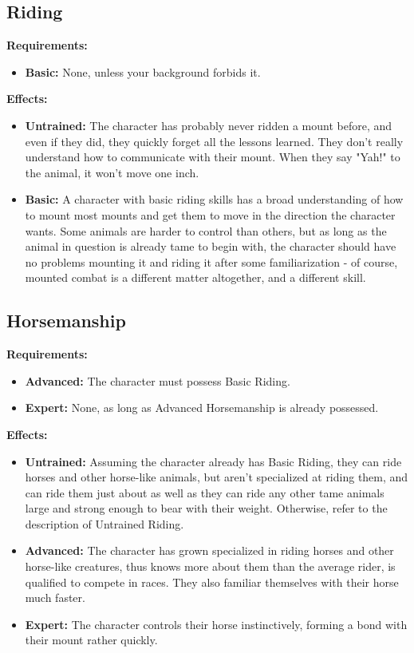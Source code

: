 \documentclass[openany,10pt,a4paper]{book}
\begin{document}
\subsection{Riding}
\begin{table}[!ht]
\centering
{}
\end{table}
\textbf{Requirements:}
\begin{itemize}
	\item \textbf{Basic:} None, unless your background forbids it.
\end{itemize}
\textbf{Effects:}
\begin{itemize}
	\item \textbf{Untrained:} The character has probably never ridden a mount before, and even if they did, they quickly forget all the lessons learned. They don't really understand how to communicate with their mount. When they say "Yah!" to the animal, it won't move one inch. 
	\item \textbf{Basic:} A character with basic riding skills has a broad understanding of how to mount most mounts and get them to move in the direction the character wants. Some animals are harder to control than others, but as long as the animal in question is already tame to begin with, the character should have no problems mounting it and riding it after some familiarization - of course, mounted combat is a different matter altogether, and a different skill.
\end{itemize}\newpage
\subsection{Horsemanship}
\begin{table}[!ht]
\centering
{}
\end{table}
\textbf{Requirements:}
\begin{itemize}
	\item \textbf{Advanced:} The character must possess Basic Riding.
	\item \textbf{Expert:} None, as long as Advanced Horsemanship is already possessed.
\end{itemize}
\textbf{Effects:}
\begin{itemize}
	\item \textbf{Untrained:} Assuming the character already has Basic Riding, they can ride horses and other horse-like animals, but aren't specialized at riding them, and can ride them just about as well as they can ride any other tame animals large and strong enough to bear with their weight. Otherwise, refer to the description of Untrained Riding.
	\item \textbf{Advanced:} The character has grown specialized in riding horses and other horse-like creatures, thus knows more about them than the average rider, is qualified to compete in races. They also familiar themselves with their horse much faster.
	\item \textbf{Expert:} The character controls their horse instinctively, forming a bond with their mount rather quickly.
\end{itemize}
\end{document}
